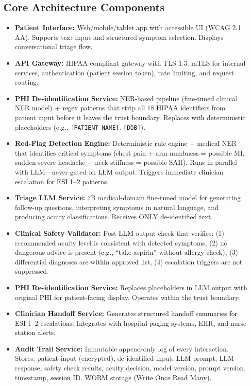 \subsection*{Core Architecture Components}
\begin{itemize}
  \item \textbf{Patient Interface:} Web/mobile/tablet app with accessible UI (WCAG 2.1 AA). Supports text input and structured symptom selection. Displays conversational triage flow.
  \item \textbf{API Gateway:} HIPAA-compliant gateway with TLS 1.3, mTLS for internal services, authentication (patient session token), rate limiting, and request routing.
  \item \textbf{PHI De-identification Service:} NER-based pipeline (fine-tuned clinical NER model) + regex patterns that strip all 18 HIPAA identifiers from patient input before it leaves the trust boundary. Replaces with deterministic placeholders (e.g., \texttt{[PATIENT\_NAME]}, \texttt{[DOB]}).
  \item \textbf{Red-Flag Detection Engine:} Deterministic rule engine + medical NER that identifies critical symptoms (chest pain + arm numbness = possible MI, sudden severe headache + neck stiffness = possible SAH). Runs in parallel with LLM---never gated on LLM output. Triggers immediate clinician escalation for ESI 1--2 patterns.
  \item \textbf{Triage LLM Service:} 7B medical-domain fine-tuned model for generating follow-up questions, interpreting symptoms in natural language, and producing acuity classifications. Receives ONLY de-identified text.
  \item \textbf{Clinical Safety Validator:} Post-LLM output check that verifies: (1) recommended acuity level is consistent with detected symptoms, (2) no dangerous advice is present (e.g., ``take aspirin'' without allergy check), (3) differential diagnoses are within approved list, (4) escalation triggers are not suppressed.
  \item \textbf{PHI Re-identification Service:} Replaces placeholders in LLM output with original PHI for patient-facing display. Operates within the trust boundary.
  \item \textbf{Clinician Handoff Service:} Generates structured handoff summaries for ESI 1--2 escalations. Integrates with hospital paging systems, EHR, and nurse station alerts.
  \item \textbf{Audit Trail Service:} Immutable append-only log of every interaction. Stores: patient input (encrypted), de-identified input, LLM prompt, LLM response, safety check results, acuity decision, model version, prompt version, timestamp, session ID. WORM storage (Write Once Read Many).

\end{itemize}
